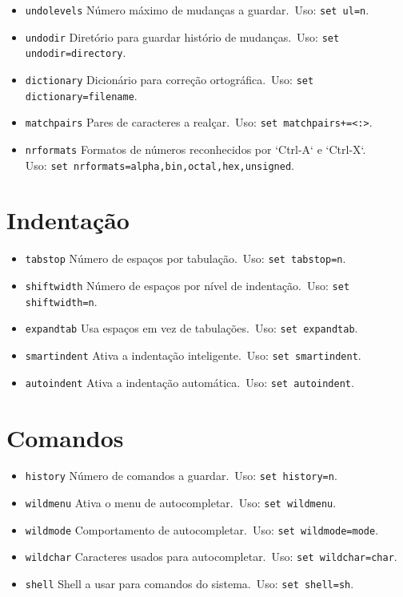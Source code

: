 \begin{itemize}
    \setlength{\itemsep}{-5pt} %
    \item \texttt{undolevels} Número máximo de mudanças a guardar.\ Uso: \texttt{set ul=n}.
    \item \texttt{undodir} Diretório para guardar histório de mudanças.\ Uso: \texttt{set undodir=directory}.
    \item \texttt{dictionary} Dicionário para correção ortográfica.\ Uso: \texttt{set dictionary=filename}.
    \item \texttt{matchpairs} Pares de caracteres a realçar.\ Uso: \texttt{set matchpairs+=<:>}.
    \item \texttt{nrformats} Formatos de números reconhecidos por `Ctrl-A` e `Ctrl-X`.\\Uso: \texttt{set nrformats=alpha,bin,octal,hex,unsigned}.
\end{itemize}

\section{Indentação}

\begin{itemize}
    \setlength{\itemsep}{-5pt} %
    \item \texttt{tabstop} Número de espaços por tabulação.\ Uso: \texttt{set tabstop=n}.
    \item \texttt{shiftwidth} Número de espaços por nível de indentação.\ Uso: \texttt{set shiftwidth=n}.
    \item \texttt{expandtab} Usa espaços em vez de tabulações.\ Uso: \texttt{set expandtab}.
    \item \texttt{smartindent} Ativa a indentação inteligente.\ Uso: \texttt{set smartindent}.
    \item \texttt{autoindent} Ativa a indentação automática.\ Uso: \texttt{set autoindent}.
\end{itemize}

\section{Comandos}

\begin{itemize}
    \setlength{\itemsep}{-5pt} %
    \item \texttt{history} Número de comandos a guardar.\ Uso: \texttt{set history=n}.
    \item \texttt{wildmenu} Ativa o menu de autocompletar.\ Uso: \texttt{set wildmenu}.
    \item \texttt{wildmode} Comportamento de autocompletar.\ Uso: \texttt{set wildmode=mode}.
    \item \texttt{wildchar} Caracteres usados para autocompletar.\ Uso: \texttt{set wildchar=char}.
    \item \texttt{shell} Shell a usar para comandos do sistema.\ Uso: \texttt{set shell=sh}.
\end{itemize}

